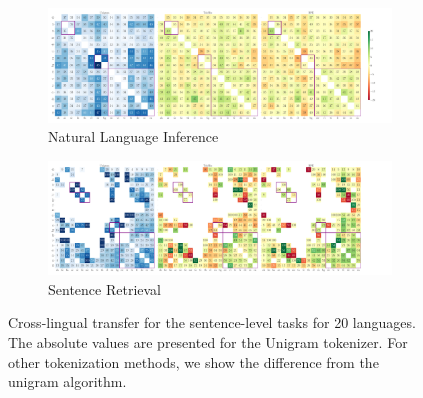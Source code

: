 \begin{figure}[tb!]
    \centering

    \begin{subfigure}[b]{0.97\linewidth}
        \centering
        \includegraphics[width=1.\linewidth]{figures/XNLI_Acc_transfer_20L.pdf}
    
        \caption{Natural Language Inference}
        \label{fig:xnli_transfer_20l}
    \end{subfigure}
    \begin{subfigure}[b]{0.97\linewidth}
        \centering
        \includegraphics[width=1.\linewidth]{figures/Tatoeba_Acc_transfer_20L.pdf}
    
        \caption{Sentence Retrieval}
        \label{fig:tatoeba_transfer_20l}
    \end{subfigure}
    
    \caption{Cross-lingual transfer for the sentence-level tasks for 20 languages. The absolute values are presented for the Unigram tokenizer. For other tokenization methods, we show  the difference from the unigram algorithm.}
\end{figure}